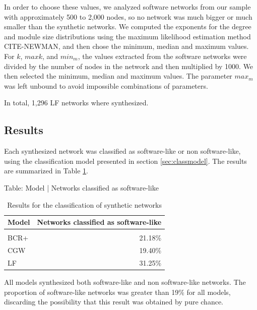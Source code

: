 In order to choose these values, we analyzed software networks from our sample
with approximately 500 to 2,000 nodes, so no network was much bigger or much
smaller than the synthetic networks. We computed the exponents for the degree
and module size distributions using the maximum likelihood estimation method
CITE-NEWMAN, and then chose the minimum, median and maximum values. For $k$,
$maxk$, and $min_m$, the values extracted from the software networks were
divided by the number of nodes in the network and then multiplied by 1000. We
then selected the minimum, median and maximum values. The parameter $max_m$ was
left unbound to avoid impossible combinations of parameters.

In total, 1,296 LF networks where synthesized.

\subsection{Results}

Each synthesized network was classified as software-like or non software-like,
using the classification model presented in section \ref{sec:classmodel}. The
results are summarized in Table \ref{tab:results}. 

\begin{table}
\caption{Results for the classification of synthetic networks}
Table: Model | Networks classified as software-like
\begin{tabular}{ l | r }
\hline
Model & Networks classified as software-like \\
\hline \\
\hline
BCR+ & 21.18\% \\ %
CGW  & 19.40\% \\  %
LF   & 31.25\% \\ %
\hline
\end{tabular}
\label{tab:results}
\end{table}

All models synthesized both software-like and non software-like networks. The
proportion of software-like networks was greater than 19\% for all models,
discarding the possibility that this result was obtained by pure chance.

%
%
%
%

